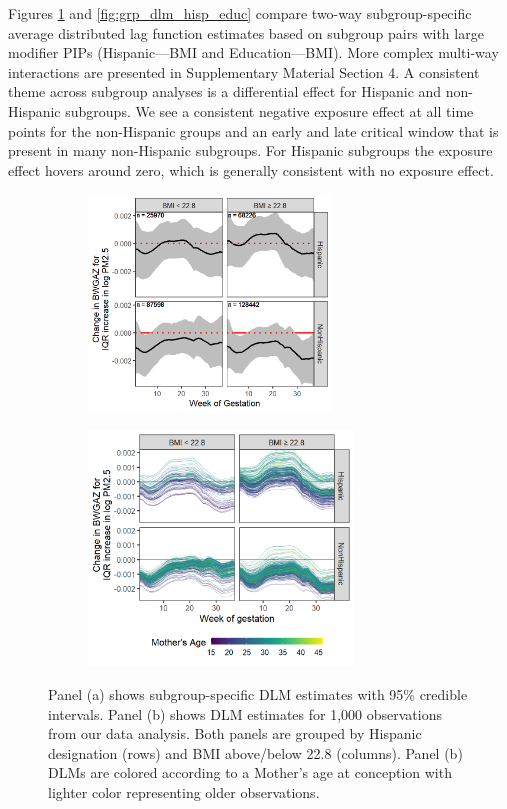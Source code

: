 \documentclass[12pt]{article}
\begin{document}
Figures \ref{fig:grp_dlm_hisp_bmi} and \ref{fig:grp_dlm_hisp_educ} compare two-way subgroup-specific average distributed lag function estimates based on subgroup pairs with large modifier PIPs (Hispanic---BMI and Education---BMI). More complex multi-way interactions are presented in Supplementary Material Section 4. A consistent theme across subgroup analyses is a differential effect for Hispanic and non-Hispanic subgroups. We see a consistent negative exposure effect at all time points for the non-Hispanic groups and an early and late critical window that is present in many non-Hispanic subgroups. For Hispanic subgroups the exposure effect hovers around zero, which is generally consistent with no exposure effect. 


\begin{figure}[!ht]
    \centering
    \begin{subfigure}{0.49\textwidth}
        \includegraphics[height=5.75cm]{img/bwgaz_grp_hisp_bmi.png}
        \vspace{0.25cm}
        \caption{}
        \label{fig:grp_dlm_hisp_bmi}
    \end{subfigure}
    \begin{subfigure}{0.49\textwidth}
        \includegraphics[height=6.25cm]{img/bwgaz_hisp_bmi_age.png}
        \caption{}
        \label{fig:ind_dlm_hisp_bmi}
    \end{subfigure}
    \caption{Panel (a) shows subgroup-specific DLM estimates with 95\% credible intervals. Panel (b) shows DLM estimates for 1,000 observations from our data analysis.  Both panels are grouped by Hispanic designation (rows) and BMI above/below 22.8 (columns). Panel (b) DLMs are colored according to a Mother's age at conception with lighter color representing older observations.}
\end{figure}
\end{document}
